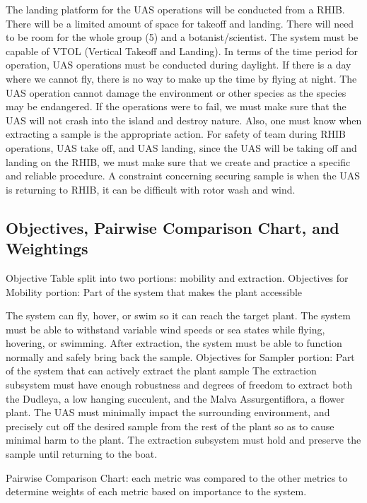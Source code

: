 \documentclass{wrcecapstone}
\begin{document}
The landing platform for the UAS operations will be conducted from a RHIB. There will be a limited amount of space for takeoff and landing. There will need to be room for the whole group (5) and a botanist/scientist.  The system must be capable of VTOL (Vertical Takeoff and Landing). In terms of the time period for operation, UAS operations must be conducted during daylight. If there is a day where we cannot fly, there is no way to make up the time by flying at night. The UAS operation cannot damage the environment or other species as the species may be endangered. If the operations were to fail, we must make sure that the UAS will not crash into the island and destroy nature.  Also, one must know when extracting a sample is the appropriate action. For safety of team during RHIB operations, UAS take off, and UAS landing, since the UAS will be taking off and landing on the RHIB, we must make sure that we create and practice a specific and reliable procedure. A constraint concerning securing sample is when the UAS is returning to RHIB, it can be difficult with rotor wash and wind. 

\subsection{Objectives, Pairwise Comparison Chart, and Weightings} 
\begin{table}
\caption{Objective Table split into two portions: mobility and extraction. Objectives for Mobility portion: Part of the system that makes the plant accessible}
\end{table}

The system can fly, hover, or swim so it can reach the target plant. The system must be able to withstand variable wind speeds or sea states while flying, hovering, or swimming. After extraction, the system must be able to function normally and safely bring back the sample.
Objectives for Sampler portion: Part of the system that can actively extract the plant sample
The extraction subsystem must have enough robustness and degrees of freedom to extract both the Dudleya, a low hanging succulent, and the Malva Assurgentiflora, a flower plant. The UAS must minimally impact the surrounding environment, and precisely cut off the desired sample from the rest of the plant so as to cause minimal harm to the plant. The extraction subsystem must hold and preserve the sample until returning to the boat.
\begin{table}
\caption{Pairwise Comparison Chart: each metric was compared to the other metrics to determine weights of each metric based on importance to the system.}
\end{table}
\end{document}
